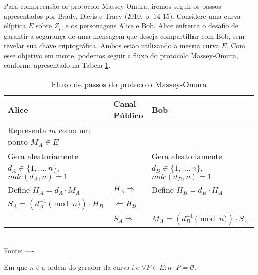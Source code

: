 Para compreensão do protocolo Massey-Omura, iremos seguir os passos
apresentados por Brady, Davis e Tracy (2010, p. 14-15). Considere uma curva
elíptica $E$ sobre $Z_{p}$, e os personagens Alice e Bob. Alice enfrenta o
desafio de garantir a segurança de uma mensagem que deseja compartilhar com
Bob, sem revelar sua chave criptográfica. Ambos estão utilizando a mesma curva
$E$. Com esse objetivo em mente, podemos seguir o fluxo do protocolo
Massey-Omura, conforme apresentado na Tabela
\ref{table:dbb74549-a025-428a-90f4-4efcedbdf9ca}. \vspace*{0.0cm}
\begin{table}[h!]\centering
	\caption{Fluxo de passos do protocolo Massey-Omura } \label{table:dbb74549-a025-428a-90f4-4efcedbdf9ca}
	\centering
	\begin{tabular}{|>{\centering\arraybackslash}m{5.5cm}|>{\centering\arraybackslash}m{3cm}|>{\centering\arraybackslash}m{5.5cm}|}
		\hline
		\textbf{Alice}                                                    & \textbf{Canal Público} & \textbf{Bob}                                                      \\
		\hline
		Representa $m$ como um ponto $M_A \in E$                          &                        &                                                                   \\
		\hline
		Gera aleatoriamente $d_A \in \{1, \ldots, n\}$, $mdc(d_A, n) = 1$ &                        & Gera aleatoriamente $d_B \in \{1, \ldots, n\}$, $mdc(d_B, n) = 1$ \\
		\hline
		Define $H_A = d_A \cdot M_A$                                      & $H_A \Rightarrow $     & Define $H_B = d_B \cdot H_A$                                      \\
		\hline
		$S_A =  (d^{-1}_A  \pmod{n}) \cdot H_B$                           & $\Leftarrow H_B$       &                                                                   \\
		\hline
		                                                                  & $S_A \Rightarrow $     & $M_A =  (d^{-1}_B \pmod{n}) \cdot S_A $                           \\
		\hline
	\end{tabular}
	\vspace*{0.4cm}\\ %
	Fonte:  ----
\end{table}
\newline Em que $n$ é a ordem do gerador da curva $i.e$ $\forall P \in E:  n \cdot P =  \mathcal{O}$.

